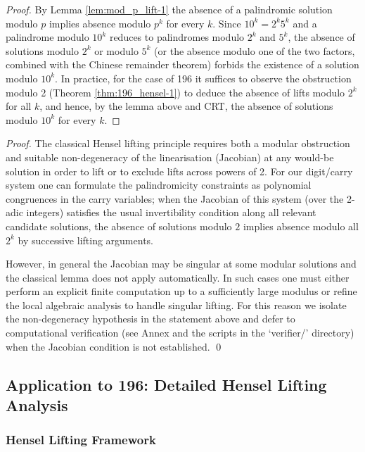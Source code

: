 \documentclass[12pt,a4paper]{article}
\begin{document}
\begin{proof}
By Lemma \ref{lem:mod_p_lift-1} the absence of a palindromic solution modulo $p$ implies absence modulo $p^k$ for every $k$. Since $10^k=2^k5^k$ and a palindrome modulo $10^k$ reduces to palindromes modulo $2^k$ and $5^k$, the absence of solutions modulo $2^k$ or modulo $5^k$ (or the absence modulo one of the two factors, combined with the Chinese remainder theorem) forbids the existence of a solution modulo $10^k$. In practice, for the case of 196 it suffices to observe the obstruction modulo 2 (Theorem \ref{thm:196_hensel-1}) to deduce the absence of lifts modulo $2^k$ for all $k$, and hence, by the lemma above and CRT, the absence of solutions modulo $10^k$ for every $k$.
\end{proof}

\begin{proof}
The classical Hensel lifting principle requires both a modular obstruction and suitable non-degeneracy of the linearisation (Jacobian) at any would-be solution in order to lift or to exclude lifts across powers of 2. For our digit/carry system one can formulate the palindromicity constraints as polynomial congruences in the carry variables; when the Jacobian of this system (over the 2-adic integers) satisfies the usual invertibility condition along all relevant candidate solutions, the absence of solutions modulo $2$ implies absence modulo all $2^k$ by successive lifting arguments.

However, in general the Jacobian may be singular at some modular solutions and the classical lemma does not apply automatically. In such cases one must either perform an explicit finite computation up to a sufficiently large modulus or refine the local algebraic analysis to handle singular lifting. For this reason we isolate the non-degeneracy hypothesis in the statement above and defer to computational verification (see Annex and the scripts in the `verifier/' directory) when the Jacobian condition is not established.
\qed
\end{proof}

\subsection{Application to 196: Detailed Hensel Lifting Analysis}

\subsubsection{Hensel Lifting Framework}
\end{document}
